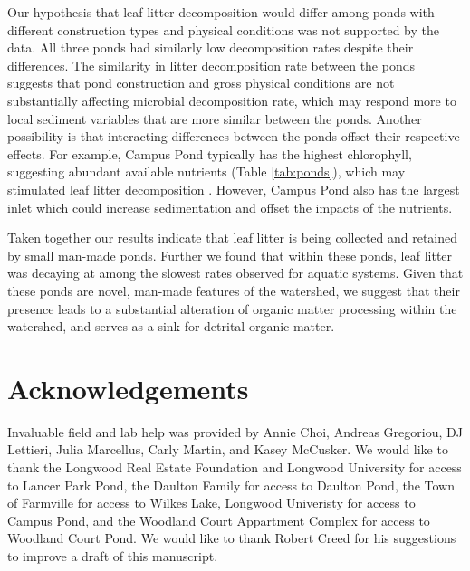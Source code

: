 \documentclass{article}
\begin{document}
Our hypothesis that leaf litter decomposition would differ among ponds with different construction types and physical conditions was not supported by the data.  All three ponds had similarly low decomposition rates despite their differences. The similarity in litter decomposition rate between the ponds suggests that pond construction and gross physical conditions are not substantially affecting microbial decomposition rate, which may respond more to local sediment variables that are more similar between the ponds. Another possibility is that interacting differences between the ponds offset their respective effects. For example, Campus Pond typically has the highest chlorophyll, suggesting abundant available nutrients (Table \ref{tab:ponds}), which may stimulated leaf litter decomposition \cite{Gulis_2003, Tant_2013}. However, Campus Pond also has the largest inlet which could increase sedimentation and offset the impacts of the nutrients.

Taken together our results indicate that leaf litter is being collected and retained by small man-made ponds. Further we found that within these ponds, leaf litter was decaying at among the slowest rates observed for aquatic systems. Given that these ponds are novel, man-made features of the watershed, we suggest that their presence leads to a substantial alteration of organic matter processing within the watershed, and serves as a sink for detrital organic matter.

\section{Acknowledgements}

 Invaluable field and lab help was provided by Annie Choi, Andreas Gregoriou, DJ Lettieri, Julia Marcellus, Carly Martin, and Kasey McCusker. We would like to thank the Longwood Real Estate Foundation and Longwood University for access to Lancer Park Pond, the Daulton Family for access to Daulton Pond, the Town of Farmville for access to Wilkes Lake, Longwood Univeristy for access to Campus Pond, and the Woodland Court Appartment Complex for access to Woodland Court Pond.  We would like to thank Robert Creed for his suggestions to improve a draft of this manuscript.

\nocite{*}



\end{document}
